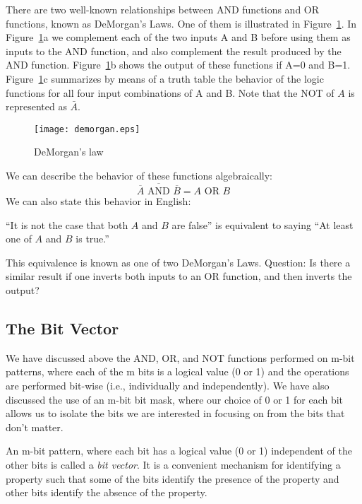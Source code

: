 \documentclass{patt}
\begin{document}
There are two well-known relationships between AND functions and OR functions, 
known as DeMorgan's Laws.  One of them is illustrated in 
Figure~\ref{fig:demorgan}.  In Figure~\ref{fig:demorgan}a we complement each of
the two inputs A and B before using them as inputs to the AND function, and
also complement the result produced by the AND function. 
Figure~\ref{fig:demorgan}b shows the output of these functions if A=0 and B=1.
Figure~\ref{fig:demorgan}c summarizes by means of a truth table the behavior 
of the logic functions for all four input combinations of A and B.  Note that
the NOT of $A$ is represented as $\bar{A}$.

\begin{figure}
\centerline{\texttt{[image: demorgan.eps]}}
\caption{DeMorgan's law}
\label{fig:demorgan}
\end{figure}

We can describe the behavior of these functions algebraically:
\begin{equation*}
\overline{\overline{A} \mbox{ AND } \overline{B}}=A \mbox{ OR } B
\end{equation*}
We can also state this behavior in English:

\medskip

``It is not the case that both $A$ and $B$ are false'' is equivalent
to saying ``At least one of $A$ and $B$ is true.''

\medskip

\noindent
This equivalence is known as one of two DeMorgan's Laws.  Question: Is there a 
similar result if one inverts both inputs to an OR function, and then 
inverts the output?

\vspace{-12pt}
\subsection{The Bit Vector}

We have discussed above the AND, OR, and NOT functions performed on m-bit 
patterns, where each of the m bits is a logical value (0 or 1) and the 
operations are performed
bit-wise (i.e., individually and independently).  We have also discussed the
use of an m-bit bit mask, where our choice of 0 or 1 for each bit allows us to
isolate the bits we are interested in focusing on from the bits that don't 
matter.

An m-bit pattern, where each bit has a logical value (0 or 1) independent of 
the other bits is called a {\em bit vector}.  It is a convenient 
mechanism for identifying a property such that some of the bits identify the
presence of the property and other bits identify the absence of the property.
\end{document}

